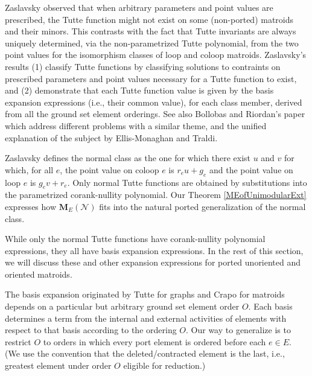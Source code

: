 \documentclass[12pt]{article}
\theoremstyle{definition}
\newcommand{\ext}[1]{\ensuremath{\mathbf{#1}}}
\begin{document}
Zaslavsky\cite{MR93a:05047} observed that when 
arbitrary parameters and point values
are prescribed, the Tutte function might not exist on some
(non-ported) matroids and their minors.  This contrasts with
the fact that Tutte invariants are always uniquely determined,
via the non-parametrized Tutte polynomial,
from the two point values for the isomorphism classes of 
loop and coloop matroids.  Zaslavsky's results
(1) classify Tutte functions by classifying solutions to
contraints on prescribed parameters and point values necessary 
for a Tutte function to exist, and (2) demonstrate that each Tutte
function value is given by the basis expansion expressions
(i.e., their common value), 
for each class member, derived from all the ground set element orderings.
See also 
Bollobas and Riordan's paper\cite{BollobasRiordanTuttePolyColored} 
which address different problems with a similar theme, and
the unified explanation of the subject by
Ellis-Monaghan and Traldi\cite{Ellis-Monaghan-Traldi}.

Zaslavsky defines the normal class as the one for which there exist 
$u$ and $v$ for which, for all $e$,
the point value on coloop $e$ is $r_eu + g_e$ 
and the point value
on loop $e$ is $g_ev + r_e$.  Only normal Tutte functions 
are obtained by substitutions into the parametrized corank-nullity
polynomial.  Our Theorem \ref{MEofUnimodularExt} expresses how
$\ext{M}_E(\mathcal{N})$ 
fits into the natural ported generalization of the
normal class.

While only the normal Tutte functions have corank-nullity
polynomial expressions, they all have basis expansion expressions.
In the rest of this section, we will discuss these and other
expansion expressions for ported unoriented and oriented matroids.




The basis expansion originated by Tutte\cite{TutteDich}
for graphs and Crapo\cite{CrapoAct} for matroids depends on 
a particular but arbitrary ground set element order $O$.
Each basis determines a term from the internal
and external activities of elements with respect to that basis
according to the ordering $O$.
Our way to generalize is to 
restrict $O$ to orders in which
every port element is ordered before 
each $e\in E$.  (We use the convention that the deleted/contracted element
is the last, i.e., greatest element under order $O$ eligible for reduction.)
\end{document}
